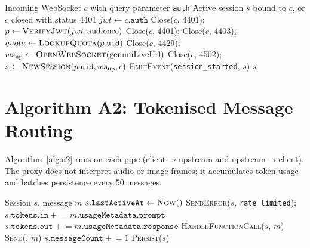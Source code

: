 \begin{algorithm}[H]
\caption{ValidateJwtAndOpenSession}
\label{alg:a1}
\begin{algorithmic}[1]
\Require Incoming WebSocket $c$ with query parameter \texttt{auth}
\Ensure Active session $s$ bound to $c$, or $c$ closed with status 4401
\State $jwt \gets c.\texttt{auth}$
 \State Close($c$, 4401); \Return \EndIf
\State $p \gets \textsc{VerifyJwt}(jwt, \text{audience})$
 \State Close($c$, 4401); \Return \EndIf
{} \State Close($c$, 4403); \Return \EndIf
\State $quota \gets \textsc{LookupQuota}(p.\texttt{uid})$
 \State Close($c$, 4429); \Return \EndIf
\State $ws_{\text{up}} \gets \textsc{OpenWebSocket}(\text{geminiLiveUrl})$
 \State Close($c$, 4502); \Return \EndIf
\State $s \gets \textsc{NewSession}(p.\texttt{uid}, ws_{\text{up}}, c)$
\State \textsc{EmitEvent}(\texttt{session\_started}, $s$) 
\State \Return $s$
\end{algorithmic}
\end{algorithm}

\section{Algorithm A2: Tokenised Message Routing}
\label{sec:algo-a2}

Algorithm~\ref{alg:a2} runs on each pipe (client$\rightarrow$upstream and upstream$\rightarrow$client). The proxy does not interpret audio or image frames; it accumulates token usage and batches persistence every 50 messages.

\begin{algorithm}[H]
\caption{RouteMessage (per pipe)}
\label{alg:a2}
\begin{algorithmic}[1]
\Require Session $s$, message $m$
\State $s.\texttt{lastActiveAt} \gets \textsc{Now}()$
 \State \textsc{SendError}($s$, \texttt{rate\_limited}); \Return \EndIf
{}
    \State $s.\texttt{tokens.in} \mathrel{+}= m.\texttt{usageMetadata.prompt}$
    \State $s.\texttt{tokens.out} \mathrel{+}= m.\texttt{usageMetadata.response}$
\EndIf
{} \State \textsc{HandleFunctionCall}($s$, $m$)
\Else \State \textsc{Send}(, $m$) \EndIf
\State $s.\texttt{messageCount} \mathrel{+}= 1$
 \State \textsc{Persist}($s$) \EndIf
\end{algorithmic}
\end{algorithm}

